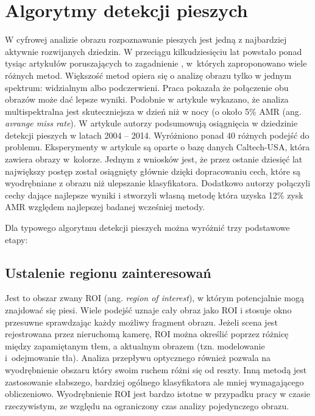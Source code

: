 \chapter{Algorytmy detekcji pieszych}

W cyfrowej analizie obrazu rozpoznawanie pieszych jest jedną z najbardziej aktywnie rozwijanych dziedzin. 
W przeciągu kilkudziesięciu lat powstało ponad tysiąc artykułów poruszających to zagadnienie \cite{zhang2015filtered}, w~których zaproponowano wiele różnych metod. 
Większość metod opiera się o analizę obrazu tylko w jednym spektrum: widzialnym albo podczerwieni. 
Praca \cite{hwang2015multispectral} pokazała że połączenie obu obrazów może dać lepsze wyniki. 
Podobnie w artykule \cite{gonzalez2016pedestrian} wykazano, że analiza multispektralna jest skuteczniejsza w dzień niż w nocy (o około 5\% AMR (ang. \textit{avrange miss rate}). 
W artykule \cite{benenson2014ten} autorzy podsumowują osiągnięcia w dziedzinie detekcji pieszych w latach 2004 -- 2014. 
Wyróżniono ponad 40 różnych podejść do problemu. 
Eksperymenty w artykule są oparte o bazę danych Caltech-USA, która zawiera obrazy w~kolorze. 
Jednym z wniosków jest, że przez ostanie dziesięć lat największy postęp został osiągnięty głównie dzięki dopracowaniu cech, które są wyodrębniane z obrazu niż ulepszanie klasyfikatora. 
Dodatkowo autorzy połączyli cechy dające najlepsze wyniki i stworzyli własną metodę która uzyska 12\% zysk AMR względem najlepszej badanej wcześniej metody.


Dla typowego algorytmu detekcji pieszych można wyróżnić trzy podstawowe etapy:

\section{Ustalenie regionu zainteresowań} 

Jest to obszar zwany ROI (ang. \textit{region of interest}), w którym potencjalnie mogą znajdować się piesi. 
Wiele podejść uznaje cały obraz jako ROI i stosuje okno przesuwne sprawdzając każdy możliwy fragment obrazu. 
Jeżeli scena jest rejestrowana przez nieruchomą kamerę, ROI można określić poprzez różnicę między zapamiętanym tłem, a aktualnym obrazem (tzn. modelowanie i~odejmowanie tła). Analiza przepływu optycznego również pozwala na wyodrębnienie obszaru który swoim ruchem różni się od reszty. Inną metodą jest zastosowanie słabszego, bardziej ogólnego klasyfikatora ale mniej wymagającego obliczeniowo.
Wyodrębnienie ROI jest bardzo istotne w przypadku pracy w czasie rzeczywistym, ze względu na ograniczony czas analizy pojedynczego obrazu.

